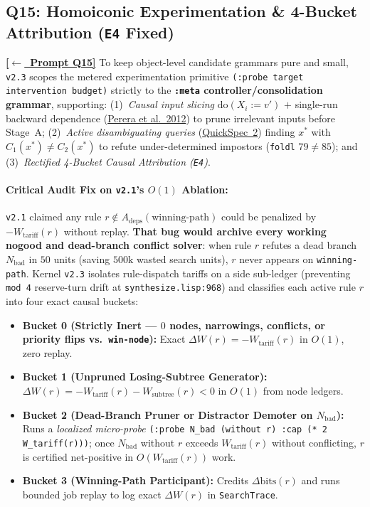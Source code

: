 \documentclass[12pt]{article}
\newcommand{\ansback}[2]{\hyperlink{#1}{\textcolor{qpurple}{\textbf{\small[\(\leftarrow\)~#2]}}}}
\newcommand{\litref}[2]{\hyperlink{lit:#1}{\textcolor{citegreen}{#2}}}
\begin{document}
\subsection{Q15: Homoiconic Experimentation \& 4-Bucket Attribution (\texttt{E4} Fixed)}
\label{ans:15}

\ansback{q:15}{Prompt Q15}
To keep object-level candidate grammars pure and small, \texttt{v2.3} scopes the metered experimentation primitive \texttt{(:probe target intervention budget)} strictly to the \textbf{\texttt{:meta} controller/consolidation grammar}, supporting:
(1)~\emph{Causal input slicing} $\mathrm{do}(X_i := v')$ $+$ single-run backward dependence (\litref{perera2012}{Perera et al.\ 2012}) to prune irrelevant inputs before Stage~A;
(2)~\emph{Active disambiguating queries} (\litref{smallbone2017}{QuickSpec~2}) finding $x^*$ with $C_1(x^*) \ne C_2(x^*)$ to refute under-determined impostors (\texttt{foldl} $79 \ne 85$); and
(3)~\emph{Rectified 4-Bucket Causal Attribution (\texttt{E4})}.

\paragraph{Critical Audit Fix on \texttt{v2.1}'s $O(1)$ Ablation:}
\texttt{v2.1} claimed any rule $r \notin A_{\mathrm{deps}}(\text{winning-path})$ could be penalized by $-W_{\mathrm{tariff}}(r)$ without replay. \textbf{That bug would archive every working nogood and dead-branch conflict solver}: when rule $r$ refutes a dead branch $N_{\mathrm{bad}}$ in $50$ units (saving $500\mathrm{k}$ wasted search units), $r$ never appears on \texttt{winning-path}. Kernel \texttt{v2.3} isolates rule-dispatch tariffs on a side sub-ledger (preventing \texttt{mod 4} reserve-turn drift at \texttt{synthesize.lisp:968}) and classifies each active rule $r$ into four exact causal buckets:
\begin{itemize}[leftmargin=1.6em, itemsep=0.12em]
  \item \textbf{Bucket 0 (Strictly Inert --- $0$ nodes, narrowings, conflicts, or priority flips vs.\ \texttt{win-node}):} Exact $\Delta W(r) = -W_{\mathrm{tariff}}(r)$ in $O(1)$, zero replay.
  \item \textbf{Bucket 1 (Unpruned Losing-Subtree Generator):} $\Delta W(r) = -W_{\mathrm{tariff}}(r) - W_{\mathrm{subtree}}(r) < 0$ in $O(1)$ from node ledgers.
  \item \textbf{Bucket 2 (Dead-Branch Pruner or Distractor Demoter on $N_{\mathrm{bad}}$):} Runs a \emph{localized micro-probe} \texttt{(:probe N\_bad (without r) :cap (* 2 W\_tariff(r)))}; once $N_{\mathrm{bad}}$ without $r$ exceeds $W_{\mathrm{tariff}}(r)$ without conflicting, $r$ is certified net-positive in $O(W_{\mathrm{tariff}}(r))$ work.
  \item \textbf{Bucket 3 (Winning-Path Participant):} Credits $\Delta\mathrm{bits}(r)$ and runs bounded job replay to log exact $\Delta W(r)$ in \texttt{SearchTrace}.
\end{itemize}
\end{document}
